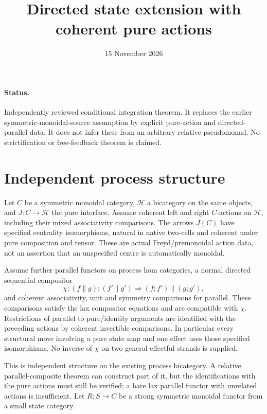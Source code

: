 \documentclass[11pt]{article}
\title{Directed state extension with coherent pure actions}
\date{15 November 2026}
\begin{document}
\maketitle
\paragraph{Status.} Independently reviewed conditional integration theorem. It replaces the earlier symmetric-monoidal-source assumption by explicit pure-action and directed-parallel data. It does not infer these from an arbitrary relative pseudomonad. No strictification or free-feedback theorem is claimed.

\section{Independent process structure}
Let $C$ be a symmetric monoidal category, $\mathcal H$ a bicategory on the same objects, and $J:C\to\mathcal H$ the pure interface. Assume coherent left and right $C$-actions on $\mathcal H$, including their mixed associativity comparisons. The arrows $J(C)$ have specified centrality isomorphisms, natural in native two-cells and coherent under pure composition and tensor. These are actual Freyd/premonoidal action data, not an assertion that an unspecified centre is automatically monoidal.

Assume further parallel functors on process hom categories, a normal directed sequential compositor
\[
 \chi:(f\parallel g);(f'\parallel g')\Rightarrow(f;f')\parallel(g;g'),
\]
and coherent associativity, unit and symmetry comparisons for parallel. These comparisons satisfy the lax compositor equations and are compatible with $\chi$. Restrictions of parallel to pure/identity arguments are identified with the preceding actions by coherent invertible comparisons. In particular every structural move involving a pure state map and one effect uses those specified isomorphisms. No inverse of $\chi$ on two general effectful strands is supplied.

This is independent structure on the existing process bicategory. A relative parallel-composite theorem can construct part of it, but the identifications with the pure actions must still be verified; a bare lax parallel functor with unrelated actions is insufficient. Let $R:S\to C$ be a strong symmetric monoidal functor from a small state category.
\end{document}
